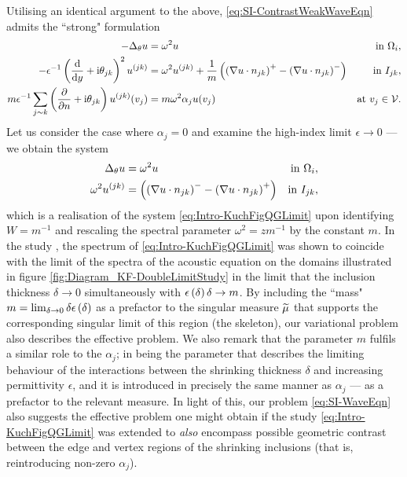 Utilising an identical argument to the above, \eqref{eq:SI-ContrastWeakWaveEqn} admits the ``strong" formulation
\begin{subequations}
	\begin{align*}
		-\Delta_\theta u 
		&= \omega^2 u 
		&\text{in } \Omega_i, \\
		- \epsilon^{-1}\left( \dfrac{\mathrm{d}}{\mathrm{d}y} + \mathrm{i}\theta_{jk} \right)^2u^{(jk)}  
		&= \omega^2 u^{(jk)} + \frac{1}{m}\left( \left( \nabla u\cdot n_{jk} \right)^+ - \left( \nabla u\cdot n_{jk} \right)^- \right)
		&\text{in } I_{jk}, \\
		m\epsilon^{-1}\sum_{j\sim k} \left( \dfrac{\partial }{\partial n}+\mathrm{i}\theta_{jk} \right) u^{(jk)}(v_j) 
		&= m\omega^2 \alpha_j u(v_j)
		&\text{at } v_j\in\mathcal{V}.
	\end{align*}
\end{subequations}
Let us consider the case where $\alpha_j=0$ and examine the high-index limit $\epsilon\rightarrow0$ --- we obtain the system
\begin{subequations}
	\begin{align*}
		\Delta_\theta u 
		&= \omega^2 u 
		&\text{in } \Omega_i, \\
		\omega^2 u^{(jk)}
		&= \left( \left( \nabla u\cdot n_{jk} \right)^- - \left( \nabla u\cdot n_{jk} \right)^+ \right)
		&\text{in } I_{jk},
	\end{align*}
\end{subequations}
which is a realisation of the system \eqref{eq:Intro-KuchFigQGLimit} upon identifying $W=m^{-1}$ and rescaling the spectral parameter $\omega^2=zm^{-1}$ by the constant $m$.
In the study \cite{figotin1998spectral}, the spectrum of \eqref{eq:Intro-KuchFigQGLimit} was shown to coincide with the limit of the spectra of the acoustic equation on the domains illustrated in figure  \ref{fig:Diagram_KF-DoubleLimitStudy} in the limit that the inclusion thickness $\delta\rightarrow0$ simultaneously with $\epsilon\left( \delta \right)\delta\rightarrow m$.
By including the ``mass" $m = \lim_{\delta\rightarrow0}\delta\epsilon\left( \delta \right)$ as a prefactor to the singular measure $\widetilde{\mu}$ that supports the corresponding singular limit of this region (the skeleton), our variational problem also describes the effective problem.
We also remark that the parameter $m$ fulfils a similar role to the $\alpha_j$; in being the parameter that describes the limiting behaviour of the interactions between the shrinking thickness $\delta$ and increasing permittivity $\epsilon$, and it is introduced in precisely the same manner as $\alpha_j$ --- as a prefactor to the relevant measure.
In light of this, our problem \eqref{eq:SI-WaveEqn} also suggests the effective problem one might obtain if the study \eqref{eq:Intro-KuchFigQGLimit} was extended to \emph{also} encompass possible geometric contrast between the edge and vertex regions of the shrinking inclusions (that is, reintroducing non-zero $\alpha_j$).

